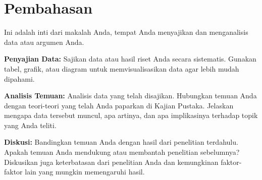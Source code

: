 \chapter{Pembahasan}


Ini adalah inti dari makalah Anda, tempat Anda menyajikan dan menganalisis data atau argumen Anda.

\textbf{Penyajian Data:} Sajikan data atau hasil riset Anda secara sistematis. Gunakan tabel, grafik, atau diagram untuk memvisualisasikan data agar lebih mudah dipahami.

\textbf{Analisis Temuan:} Analisis data yang telah disajikan. Hubungkan temuan Anda dengan teori-teori yang telah Anda paparkan di Kajian Pustaka. Jelaskan mengapa data tersebut muncul, apa artinya, dan apa implikasinya terhadap topik yang Anda teliti.

\textbf{Diskusi:} Bandingkan temuan Anda dengan hasil dari penelitian terdahulu. Apakah temuan Anda mendukung atau membantah penelitian sebelumnya? Diskusikan juga keterbatasan dari penelitian Anda dan kemungkinan faktor-faktor lain yang mungkin memengaruhi hasil.